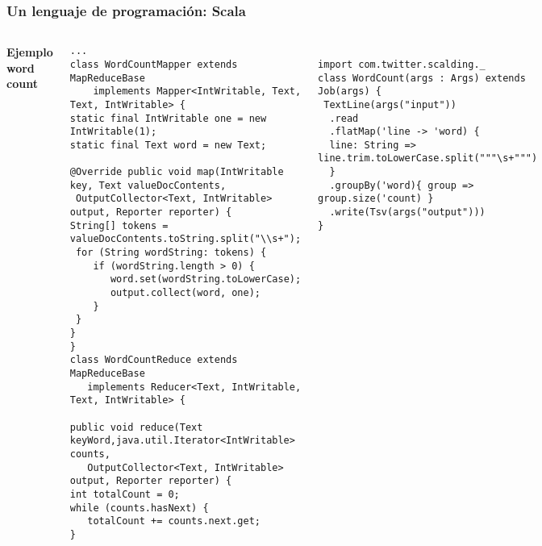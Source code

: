 \documentclass{beamer}
\begin{document}
\begin{frame}[fragile]
\frametitle{Un lenguaje de programación: Scala}
\begin{columns}[c] %

\textbf{Ejemplo word count}
\begin{example}
\begin{small}\fontsize{5}{1}\selectfont
\begin{verbatim}
...
class WordCountMapper extends MapReduceBase
    implements Mapper<IntWritable, Text, Text, IntWritable> {
static final IntWritable one = new IntWritable(1);
static final Text word = new Text;

@Override public void map(IntWritable key, Text valueDocContents,
 OutputCollector<Text, IntWritable> output, Reporter reporter) {
String[] tokens = valueDocContents.toString.split("\\s+");
 for (String wordString: tokens) {
    if (wordString.length > 0) {
       word.set(wordString.toLowerCase);
       output.collect(word, one);
    }
 }
}
}
class WordCountReduce extends MapReduceBase
   implements Reducer<Text, IntWritable, Text, IntWritable> {
	
public void reduce(Text keyWord,java.util.Iterator<IntWritable> counts,
   OutputCollector<Text, IntWritable> output, Reporter reporter) {
int totalCount = 0;
while (counts.hasNext) {
   totalCount += counts.next.get;
}
\end{verbatim}\end{small}
\end{example}
\begin{example}
\begin{small}\fontsize{5}{1}\selectfont
\begin{verbatim}

import com.twitter.scalding._
class WordCount(args : Args) extends Job(args) {
 TextLine(args("input"))
  .read
  .flatMap('line -> 'word) {
  line: String => line.trim.toLowerCase.split("""\s+""")
  }
  .groupBy('word){ group => group.size('count) }
  .write(Tsv(args("output")))
}

\end{verbatim}\end{small}
\end{example}
\end{columns}
\end{frame}
\end{document}
